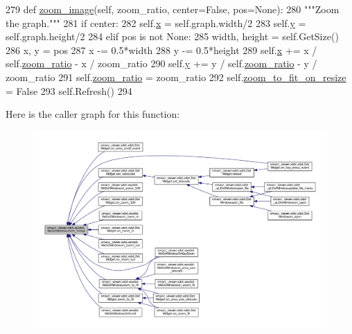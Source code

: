 \begin{DoxyCode}
279   \textcolor{keyword}{def }\hyperlink{classsmacc__viewer_1_1xdot_1_1wxxdot_1_1WxDotWindow_a2bf85fb763c88fed05071ebb1fad5b57}{zoom\_image}(self, zoom\_ratio, center=False, pos=None):
280     \textcolor{stringliteral}{"""Zoom the graph."""}
281     \textcolor{keywordflow}{if} center:
282       self.\hyperlink{classsmacc__viewer_1_1xdot_1_1wxxdot_1_1WxDotWindow_af93c06ad884159a0fcfba52dcbc0ac54}{x} = self.graph.width/2
283       self.\hyperlink{classsmacc__viewer_1_1xdot_1_1wxxdot_1_1WxDotWindow_add4a798dbd2255643a4dadf0e7cc417c}{y} = self.graph.height/2
284     \textcolor{keywordflow}{elif} pos \textcolor{keywordflow}{is} \textcolor{keywordflow}{not} \textcolor{keywordtype}{None}:
285       width, height = self.GetSize()
286       x, y = pos
287       x -= 0.5*width
288       y -= 0.5*height
289       self.\hyperlink{classsmacc__viewer_1_1xdot_1_1wxxdot_1_1WxDotWindow_af93c06ad884159a0fcfba52dcbc0ac54}{x} += x / self.\hyperlink{classsmacc__viewer_1_1xdot_1_1wxxdot_1_1WxDotWindow_ab53373bad50bdff06f2b31afa577fca2}{zoom\_ratio} - x / zoom\_ratio
290       self.\hyperlink{classsmacc__viewer_1_1xdot_1_1wxxdot_1_1WxDotWindow_add4a798dbd2255643a4dadf0e7cc417c}{y} += y / self.\hyperlink{classsmacc__viewer_1_1xdot_1_1wxxdot_1_1WxDotWindow_ab53373bad50bdff06f2b31afa577fca2}{zoom\_ratio} - y / zoom\_ratio
291     self.\hyperlink{classsmacc__viewer_1_1xdot_1_1wxxdot_1_1WxDotWindow_ab53373bad50bdff06f2b31afa577fca2}{zoom\_ratio} = zoom\_ratio
292     self.\hyperlink{classsmacc__viewer_1_1xdot_1_1wxxdot_1_1WxDotWindow_ad624d96f745b20c66119a35fa1d65ae6}{zoom\_to\_fit\_on\_resize} = \textcolor{keyword}{False}
293     self.Refresh()
294 
\end{DoxyCode}


Here is the caller graph for this function\+:
\nopagebreak
\begin{figure}[H]
\begin{center}
\leavevmode
\includegraphics[width=350pt]{classsmacc__viewer_1_1xdot_1_1wxxdot_1_1WxDotWindow_a2bf85fb763c88fed05071ebb1fad5b57_icgraph}
\end{center}
\end{figure}


